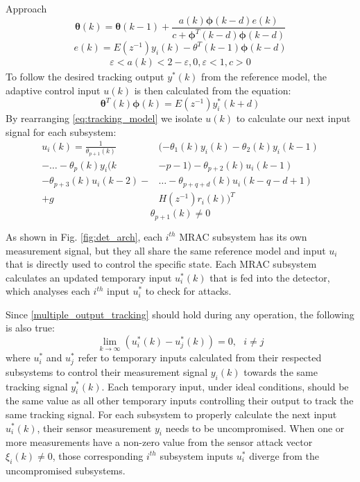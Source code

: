 \begin{section}{Approach}
	\begin{equation}
	\label{eq:Modified_Proj_Algorithm}
	\bm{\theta}(k)=\bm{\theta}(k-1)+\frac{a(k)\bm{\phi}(k-d)e(k)}{c+\bm{\phi}^T(k-d)\bm{\phi}(k-d)}
	\end{equation}
	\begin{equation}
	e(k)=E(z^{-1})y_i(k)-\theta^T(k-1)\bm{\phi}(k-d)
	\end{equation}
	\begin{align*}
	\varepsilon<a(k)<2-\varepsilon, 0,\varepsilon<1, c>0
	\end{align*}
To follow the desired tracking output $y^*(k)$ from the reference model, the adaptive control input $u(k)$ is then calculated from the equation:
    \begin{equation}
    \label{eq:tracking_model}
	\bm{\theta}^T(k)\bm{\phi}(k)=E(z^{-1})y_i^*(k+d)
	\end{equation}
By rearranging \eqref{eq:tracking_model} we isolate $u(k)$ to calculate our next input signal for each subsystem:
	\begin{align}
	\label{eq:End}
	u_i(k)=\frac{1}{\theta_{p+1}(k)}&(-\theta_1(k)y_i(k)-\theta_2(k)y_i(k-1)  \nonumber \\
    -\dots-\theta_p(k)y_i(k&-p-1)-\theta_{p+2}(k)u_i(k-1)  \\
	-\theta_{p+3}(k)u_i(k-2)-& \dots - \theta_{p+q+d}(k)u_i(k-q-d+1) \nonumber \\
	+g&H(z^{-1})r_i(k))^T \nonumber
	\end{align}
    \begin{equation}
	\theta_{p+1}(k)\neq0 \nonumber
	\end{equation}





	
As shown in Fig. \ref{fig:det_arch}, each $i^{th}$ MRAC subsystem has its own measurement signal, but they all share the same reference model and input $u_i$ that is directly used to control the specific state. Each MRAC subsystem calculates an updated temporary input $u^*_i(k)$ that is fed into the detector, which analyses each $i^{th}$ input $u^*_i$ to check for attacks.

Since \eqref{multiple_output_tracking} should hold during any operation, the following is also true:
\begin{equation}
    \label{eq:u_to_0}
    \lim_{k\to\infty}(u^*_i(k)-u^*_j(k))=0, \text{ }i\neq j
\end{equation}
where $u^*_i$ and $u^*_j$ refer to temporary inputs calculated from their respected subsystems to control their measurement signal $y_i(k)$ towards the same tracking signal $y_i^*(k)$. Each temporary input, under ideal conditions, should be the same value as all other temporary inputs controlling their output to track the same tracking signal. For each subsystem to properly calculate the next input $u^*_i(k)$, their sensor measurement $y_i$ needs to be uncompromised. When one or more measurements have a non-zero value from the sensor attack vector $\xi_i(k) \neq 0$, those corresponding $i^{th}$ subsystem inputs $u^*_i$ diverge from the uncompromised subsystems.


\end{section}
